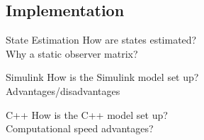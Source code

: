 \subsection{Implementation}
\begin{frame}{State Estimation}
  How are states estimated?\\
  Why a static observer matrix?
\end{frame}

\begin{frame}{Simulink}
  How is the Simulink model set up?\\
  Advantages/disadvantages
\end{frame}

\begin{frame}{C++}
  How is the C++ model set up?\\
  Computational speed advantages?
\end{frame}

